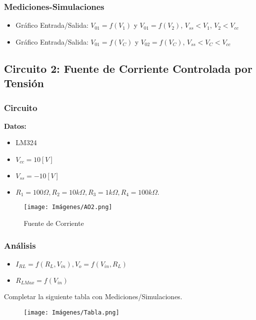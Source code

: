     \subsubsection{Mediciones-Simulaciones}
        \begin{itemize}
            \item Gráfico Entrada/Salida: $V_{01} = f(V_1)$ y $V_{01} = f(V_2)$, $V_{ss}<V_1$, $V_{2}<V_{cc}$ 
            \item Gráfico Entrada/Salida: $V_{01} = f(V_C)$ y $V_{02} = f(V_C)$, $V_{ss}<V_C<V_{cc}$ 
        \end{itemize}

\subsection{Circuito 2: Fuente de Corriente Controlada por Tensión}
    \subsubsection{Circuito}
    	\begin{center}
            \textbf{Datos:}
        \end{center}
        \begin{itemize}
            \item LM324
            \item $V_{cc}= 10 [V]$
            \item $V_{ss}= -10 [V]$
            \item $R_1 = 100 \Omega, R_2 = 10k\Omega, R_3 = 1k\Omega, R_4 = 100k\Omega.$
        \end{itemize}
    	\begin{figure}[ht]
    		\centering
    		\texttt{[image: Imágenes/AO2.png]}
    		\caption{Fuente de Corriente}
    	\end{figure}
     
     \subsubsection{Análisis}
        \begin{itemize}
            \item $I_{RL} = f(R_L, V_{in}), V_o = f(V_{in}, R_L)$
            \item $R_{LMax} = f(V_{in})$
        \end{itemize}
        Completar la siguiente tabla con Mediciones/Simulaciones.\\
        \begin{figure}[ht]
    		\centering
    		\texttt{[image: Imágenes/Tabla.png]}
    	\end{figure}

